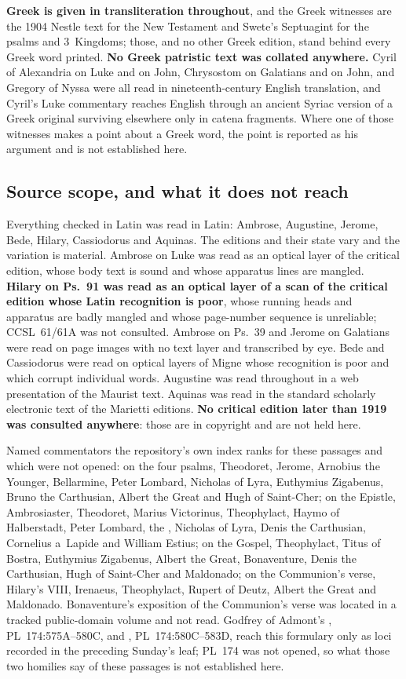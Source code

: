 \textbf{Greek is given in transliteration throughout}, and the Greek witnesses are
the 1904 Nestle text for the New Testament and Swete's Septuagint for the psalms
and 3~Kingdoms; those, and no other Greek edition, stand behind every Greek word
printed. \textbf{No Greek patristic text was collated anywhere.} Cyril of
Alexandria on Luke and on John, Chrysostom on Galatians and on John, and Gregory
of Nyssa were all read in nineteenth-century English translation, and Cyril's Luke
commentary reaches English through an ancient Syriac version of a Greek original
surviving elsewhere only in catena fragments. Where one of those witnesses makes a
point about a Greek word, the point is reported as his argument and is not
established here.

\subsection*{Source scope, and what it does not reach}

Everything checked in Latin was read in Latin: Ambrose, Augustine, Jerome, Bede,
Hilary, Cassiodorus and Aquinas. The editions and their state vary and the
variation is material. Ambrose on Luke was read as an optical layer of the
critical edition, whose body text is sound and whose apparatus lines are mangled.
\textbf{Hilary on Ps.~91 was read as an optical layer of a scan of the critical
edition whose Latin recognition is poor}, whose running heads and apparatus are
badly mangled and whose page-number sequence is unreliable; CCSL~61/61A was not
consulted. Ambrose on Ps.~39 and Jerome on Galatians were read on page images with
no text layer and transcribed by eye. Bede and Cassiodorus were read on optical
layers of Migne whose recognition is poor and which corrupt individual words.
Augustine was read throughout in a web presentation of the Maurist text. Aquinas
was read in the standard scholarly electronic text of the Marietti editions.
\textbf{No critical edition later than 1919 was consulted anywhere}: those are in
copyright and are not held here.

Named commentators the repository's own index ranks for these passages and which
were not opened: on the four psalms, Theodoret, Jerome, Arnobius the Younger,
Bellarmine, Peter Lombard, Nicholas of Lyra, Euthymius Zigabenus, Bruno the
Carthusian, Albert the Great and Hugh of Saint-Cher; on the Epistle,
Ambrosiaster, Theodoret, Marius Victorinus, Theophylact, Haymo of Halberstadt,
Peter Lombard, the , Nicholas of Lyra, Denis the
Carthusian, Cornelius a~Lapide and William Estius; on the Gospel, Theophylact,
Titus of Bostra, Euthymius Zigabenus, Albert the Great, Bonaventure, Denis the
Carthusian, Hugh of Saint-Cher and Maldonado; on the Communion's verse, Hilary's
 VIII, Irenaeus, Theophylact, Rupert of Deutz, Albert the
Great and Maldonado. Bonaventure's exposition of the Communion's verse was
located in a tracked public-domain volume and not read. Godfrey of Admont's
, PL~174:575A--580C, and ,
PL~174:580C--583D, reach this formulary only as loci recorded in the preceding
Sunday's leaf; PL~174 was not opened, so what those two homilies say of these
passages is not established here.

